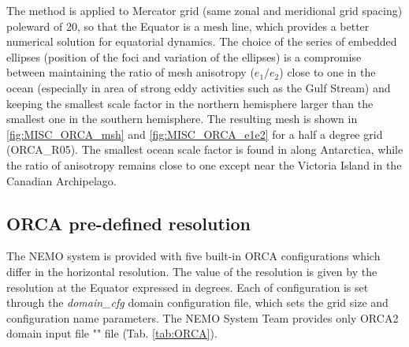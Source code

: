 \documentclass[../main/NEMO_manual]{subfiles}
\begin{document}
The method is applied to Mercator grid (\ie same zonal and meridional grid spacing) poleward of 20,
so that the Equator is a mesh line, which provides a better numerical solution for equatorial dynamics.
The choice of the series of embedded ellipses (position of the foci and variation of the ellipses)
is a compromise between maintaining the ratio of mesh anisotropy ($e_1 / e_2$) close to one in the ocean
(especially in area of strong eddy activities such as the Gulf Stream) and keeping the smallest scale factor in
the northern hemisphere larger than the smallest one in the southern hemisphere.
The resulting mesh is shown in \autoref{fig:MISC_ORCA_msh} and \autoref{fig:MISC_ORCA_e1e2} for
a half a degree grid (ORCA\_R05).
The smallest ocean scale factor is found in along Antarctica,
while the ratio of anisotropy remains close to one except near the Victoria Island in the Canadian Archipelago. 

\subsection{ORCA pre-defined resolution}
\label{subsec:CFG_orca_resolution}

The NEMO system is provided with five built-in ORCA configurations which differ in the horizontal resolution.
The value of the resolution is given by the resolution at the Equator expressed in degrees.
Each of configuration is set through the \textit{domain\_cfg} domain configuration file,
which sets the grid size and configuration name parameters.
The NEMO System Team provides only ORCA2 domain input file "" file
(Tab. \autoref{tab:ORCA}).
\end{document}
